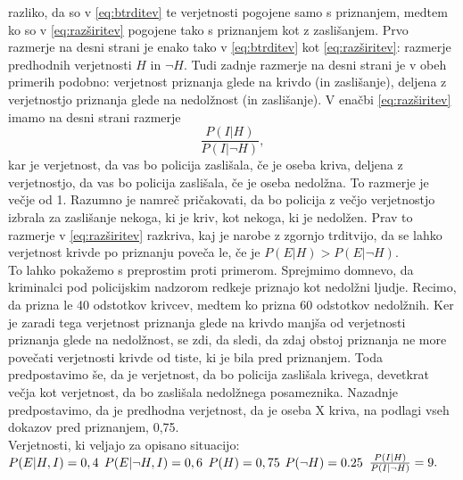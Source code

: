 \documentclass[mat1, tisk]{fmfdelo}
\theoremstyle{definition} %
\theoremstyle{trditev} %
\theoremstyle{izrek}
\begin{document}
razliko, da so v \eqref{eq:btrditev} te verjetnosti pogojene samo s priznanjem, medtem ko so v \eqref{eq:razširitev} pogojene tako s priznanjem kot z zaslišanjem. Prvo razmerje na desni strani je enako 
tako v \eqref{eq:btrditev} kot \eqref{eq:razširitev}: razmerje predhodnih verjetnosti $H$ in $\neg H$. Tudi zadnje razmerje na desni strani je v obeh primerih podobno: verjetnost priznanja glede na 
krivdo (in zaslišanje), deljena z verjetnostjo priznanja glede na nedolžnost (in zaslišanje). V enačbi \eqref{eq:razširitev} imamo na desni strani razmerje 
\[\frac{P(I \lvert H)}{P(I \lvert \neg H)},\] kar je verjetnost, da vas bo policija zaslišala, če je oseba kriva, deljena z verjetnostjo, da vas bo policija 
zaslišala, če je oseba nedolžna. To razmerje je večje od 1. Razumno je namreč pričakovati, da bo policija z večjo verjetnostjo izbrala za zaslišanje nekoga, 
ki je kriv, kot nekoga, ki je nedolžen. Prav to razmerje v \eqref{eq:razširitev} razkriva, kaj je narobe z zgornjo trditvijo, da se lahko verjetnost krivde po priznanju poveča le, 
če je $P(E \lvert H) > P(E \lvert \neg H)$. \\
To lahko pokažemo s preprostim proti primerom. Sprejmimo domnevo, da kriminalci pod policijskim nadzorom redkeje priznajo kot nedolžni ljudje. Recimo, da prizna 
le 40 odstotkov krivcev, medtem ko prizna 60 odstotkov nedolžnih. Ker je zaradi tega verjetnost priznanja glede na krivdo manjša od verjetnosti priznanja glede 
na nedolžnost, se zdi, da sledi, da zdaj obstoj priznanja ne more povečati verjetnosti krivde od tiste, ki je bila pred priznanjem. Toda predpostavimo še, 
da je verjetnost, da bo policija zaslišala krivega, devetkrat večja kot verjetnost, da bo zaslišala nedolžnega posameznika. Nazadnje predpostavimo, da je 
predhodna verjetnost, da je oseba X kriva, na podlagi vseh dokazov pred priznanjem, 0,75. \\
Verjetnosti, ki veljajo za opisano situacijo:\\ \vspace{2mm}
$P(E \lvert H, I) = 0,4\\ \vspace{2mm}$
$P(E \lvert \neg H, I) = 0,6\\ \vspace{2mm}$
$P(H) = 0,75\\ \vspace{2mm}$
$P(\neg H) = 0.25\\ \vspace{2mm}$
$\frac{P(I \lvert H)}{P(I \lvert \neg H)} = 9.\\ \vspace{2mm}$
\end{document}
